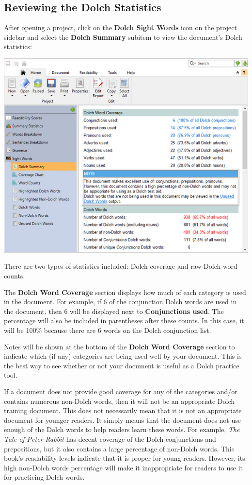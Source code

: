 \documentclass[
]{book}
\theoremstyle{definition}
\theoremstyle{definition}
\theoremstyle{definition}
\theoremstyle{definition}
\theoremstyle{remark}
\begin{document}
\hypertarget{reviewing-dolch-stats}{%
\subsection*{Reviewing the Dolch Statistics}\label{reviewing-dolch-stats}}

After opening a project, click on the \textbf{Dolch Sight Words} icon on the project sidebar and select the \textbf{Dolch Summary} subitem to view the document's Dolch statistics:

\includegraphics{Images/dolchsummary.png}

There are two types of statistics included: Dolch coverage and raw Dolch word counts.

The \textbf{Dolch Word Coverage} section displays how much of each category is used in the document. For example, if 6 of the conjunction Dolch words are used in the document, then 6 will be displayed next to \textbf{Conjunctions used}. The percentage will also be included in parentheses after these counts. In this case, it will be 100\% because there are 6 words on the Dolch conjunction list.

Notes will be shown at the bottom of the \textbf{Dolch Word Coverage} section to indicate which (if any) categories are being used well by your document. This is the best way to see whether or not your document is useful as a Dolch practice tool.

If a document does not provide good coverage for any of the categories and/or contains numerous non-Dolch words, then it will not be an appropriate Dolch training document. This does not necessarily mean that it is not an appropriate document for younger readers. It simply means that the document does not use enough of the Dolch words to help readers learn these words. For example, \emph{The Tale of Peter Rabbit} has decent coverage of the Dolch conjunctions and prepositions, but it also contains a large percentage of non-Dolch words. This book's readability levels indicate that it is proper for young readers. However, its high non-Dolch words percentage will make it inappropriate for readers to use it for practicing Dolch words.
\end{document}
